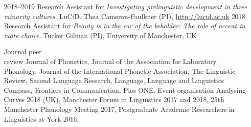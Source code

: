 \documentclass[9pt]{developercv} %
\begin{document}

\begin{entrylist}
\end{entrylist}



\begin{entrylist}
	\entry
		{2018--2019}
		{\textnormal{Research Assistant for \textit{Investigating prelinguistic development in three minority cultures}, LuCiD.}}
		{}
		{Thea Cameron-Faulkner (PI), \url{http://lucid.ac.uk}}
	\entry
		{2018}
		{\textnormal{Research Assistant for \textit{Beauty is in the ear of the beholder: The role of accent in mate choice}.}}
		{}
		{Tucker Gilman (PI), University of Manchester, UK}
\end{entrylist}



\begin{entrylist}
	\entry
		{Journal peer \\ review}
		{\textnormal{Journal of Phonetics, Journal of the Association for Laboratory Phonology, Journal of the International Phonetic Association, The Linguistic Review, Second Language Research, Language, Language and Linguistics Compass, Frontiers in Communication, Plos ONE.}}
		{}
		{}
	\entry
		{Event organisation}
		{\textnormal{Analysing Curves 2018 (UK), Manchester Forum in Linguistics 2017 and 2018, 25th Manchester Phonology Meeting 2017, Postgraduate Academic Researchers in Linguistics at York 2016.}}
		{}
		{}
\end{entrylist}
\end{document}
